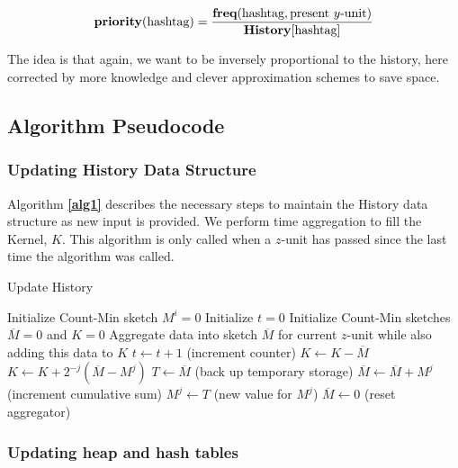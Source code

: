 \documentclass[twoside]{article}
\newcommand{\aref}[1]
 {\textbf{\autoref{#1}}}
\begin{document}
{\begin{equation} 
\label{eq:priority}
\textbf{priority}(\textnormal{hashtag}) = \frac{\textbf{freq}(\textnormal{hashtag}, \textnormal{present } y \textnormal{-unit})}{\textbf{History}[\textnormal{hashtag}]}
\end{equation}

The idea is that again, we want to be inversely proportional to the history, here corrected by more knowledge and clever approximation schemes to save space.


\subsection{Algorithm Pseudocode} 

\subsubsection{Updating History Data Structure}

Algorithm \aref{alg1} describes the necessary steps to maintain the History data structure as new input is provided. We perform time aggregation to fill the Kernel, $K$. This algorithm is only called when a $z$-unit has passed since the last time the algorithm was called.

\begin{algorithm} 
\caption{Update History} \label{alg1}
\begin{algorithmic}[1]
	\State Initialize Count-Min sketch $M^i = 0$
\EndFor
\State Initialize $t = 0$
\State Initialize Count-Min sketches $\overline{M} = 0$ and $K = 0$
	\State Aggregate data into sketch $\overline{M}$ for current $z$-unit while also adding this data to $K$
	\State $t \leftarrow t + 1$ (increment counter)
	\State $K \leftarrow K - \overline{M}$
		\State $K \leftarrow K + 2^{-j}(\overline{M} - M^j)$
		\State $T \leftarrow \overline{M}$ (back up temporary storage)
		\State $\overline{M} \leftarrow \overline{M} + M^j$ (increment cumulative sum)
		\State $M^j \leftarrow T$ (new value for $M^j$)
	\EndFor
	\State $\overline{M} \leftarrow 0$ (reset aggregator)
\EndWhile
\end{algorithmic}
\end{algorithm}
 


\subsubsection{Updating heap and hash tables}

}
\end{document}
